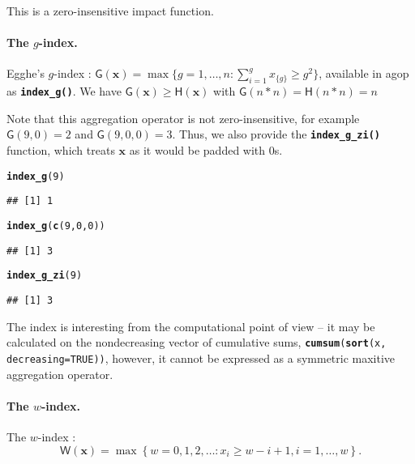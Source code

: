 \documentclass[11pt]{article}\usepackage{graphicx, color}
\makeatletter
\newcommand{\hlfunctioncall}[1]{\textcolor[rgb]{0.501960784313725,0,0.329411764705882}{\textbf{#1}}}%
\newcommand{\hlargument}[1]{\textcolor[rgb]{0.690196078431373,0.250980392156863,0.0196078431372549}{#1}}%
\newenvironment{kframe}{%
 \def\at@end@of@kframe{}%
 \ifinner\ifhmode%
  \def\at@end@of@kframe{\end{minipage}}%
  \begin{minipage}{\columnwidth}%
 \fi\fi%
 \def\FrameCommand##1{\hskip\@totalleftmargin \hskip-\fboxsep
 \colorbox{shadecolor}{##1}\hskip-\fboxsep
     \hskip-\linewidth \hskip-\@totalleftmargin \hskip\columnwidth}%
 \MakeFramed {\advance\hsize-\width
   \@totalleftmargin\z@ \linewidth\hsize
   \@setminipage}}%
 {\par\unskip\endMakeFramed%
 \at@end@of@kframe}
\newenvironment{knitrout}{}{} %
\newcommand{\package}[1]{\textsf{#1}\xspace}
\newcommand{\Rfunc}[1]{\texttt{\hlfunctioncall{#1}}}
\newcommand{\argument}[1]{\texttt{\hlargument{#1}}}
\newcommand{\vect}[1]{{\mathbf{#1}}}
\newcommand{\func}[1]{{\mathsf{#1}}}
\theoremstyle{remark}
\theoremstyle{definition}
\makeatother
\begin{document}
This is a zero-insensitive impact function.

\paragraph{The $g$-index.}
Egghe's $g$-index \cite{Egghe2006:g}:
$\func{G}(\vect{x})=\max\{g=1,\dots,n: \sum_{i=1}^g x_{\{g\}}\ge g^2\}$,
available in \package{agop} as \Rfunc{index\_g()}.
We have $\func{G}(\vect{x})\ge \func{H}(\vect{x})$
with $\func{G}(n\ast n)=\func{H}(n\ast n)=n$


Note that this aggregation operator is not zero-insensitive,
for example $\func{G}(9,0)=2$ and $\func{G}(9,0,0)=3$.
Thus, we also provide the \Rfunc{index\_g\_zi()} function,
which treats $\vect{x}$ as it would be padded with $0$s.


\begin{knitrout}\small
{}\color{fgcolor}\begin{kframe}
\begin{alltt}
\hlfunctioncall{index_g}(9)
\end{alltt}
\begin{verbatim}
## [1] 1
\end{verbatim}
\begin{alltt}
\hlfunctioncall{index_g}(\hlfunctioncall{c}(9,0,0))
\end{alltt}
\begin{verbatim}
## [1] 3
\end{verbatim}
\begin{alltt}
\hlfunctioncall{index_g_zi}(9)
\end{alltt}
\begin{verbatim}
## [1] 3
\end{verbatim}
\end{kframe}
\end{knitrout}


The index is interesting from the computational point of view --
it may be calculated on the nondecreasing vector of cumulative sums,
\texttt{\Rfunc{cumsum}(\Rfunc{sort}(x, \argument{decreasing=}TRUE))},
however, it cannot be expressed as a symmetric maxitive aggregation operator.


\paragraph{The $w$-index.}
 The $w$-index \cite{Woeginger2008:axiomatich}:
\begin{equation}\label{Eq:IndexW}
\func{W}(\vect{x}) = \max\left\{w=0,1,2,\ldots: {x}_{i} \ge w-i+1, i=1,\dots,w\right\}.
\end{equation}
\end{document}
